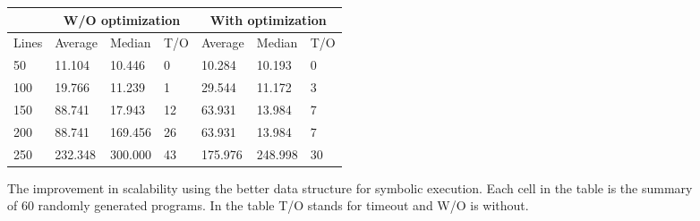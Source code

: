 \documentclass{llncs}
\begin{document}
\begin{figure}[htb]
	
	\begin{minipage}{0.6\textwidth}
\begin{tabular}{|l|l|l|l|l|l|l|}
	\hline
	& \multicolumn{3}{c|}{\small W/O optimization}	& \multicolumn{3}{c|}{\small With optimization} \\
	\hline
	\small Lines & \small Average & \small Median & \small T/O & \small Average & \small Median & \small T/O \\
	\hline
	\hline
	50	&	11.104	&	10.446	&	0	&	10.284	&	10.193	&	0	\\
	\hline                                                                              
	100	&	19.766	&	11.239	&	1	&	29.544	&	11.172	&	3	\\
	\hline                                                                             
	150	&	88.741	&	17.943	&	12	&	63.931	&	13.984	&	7	\\
	\hline                                                                             
	200	&	88.741	&	169.456	&	26	&	63.931	&	13.984	&	7	\\
	\hline                                                                             
	250	&	232.348	&	300.000	&	43	&	175.976	&	248.998	&	30	\\
	\hline
\end{tabular}
	\end{minipage}	
	\begin{minipage}{0.4\textwidth}
	\end{minipage}				

	
	\caption{The improvement in scalability using the better data structure for symbolic execution. Each cell in the table is the summary of 60 randomly generated programs. In the table T/O stands for timeout and W/O is without. } 
	\label{tab:opt2}
\end{figure}
\end{document}
